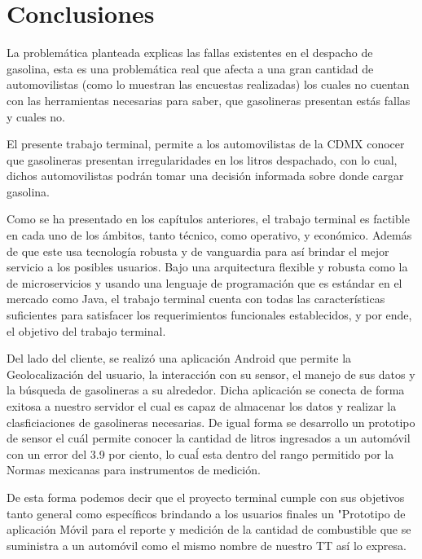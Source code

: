 \chapter{Conclusiones}\label{chapter7}
La problemática planteada explicas las fallas existentes en el despacho de gasolina, esta es una problemática real que afecta a una gran cantidad de automovilistas (como lo muestran las encuestas realizadas) los cuales no cuentan con las herramientas necesarias para saber, que gasolineras presentan estás fallas y cuales no. 

El presente trabajo terminal, permite a los automovilistas de la CDMX conocer que gasolineras presentan irregularidades en los litros despachado, con lo cual, dichos automovilistas podrán tomar una decisión informada sobre donde cargar gasolina.

Como se ha presentado en los capítulos anteriores, el trabajo terminal es factible en cada uno de los ámbitos, tanto técnico, como operativo, y económico. Además de que este usa tecnología robusta y de vanguardia para así brindar el mejor servicio a los posibles usuarios. Bajo una arquitectura flexible y robusta como la de microservicios y usando una lenguaje de programación que es estándar en el mercado como Java, el trabajo terminal cuenta con todas las características suficientes para satisfacer los requerimientos funcionales establecidos, y por ende, el objetivo del trabajo terminal.

Del lado del cliente, se realizó una aplicación Android que permite la Geolocalización del usuario, la interacción con su sensor, el manejo de sus datos y la búsqueda de gasolineras a su alrededor. Dicha aplicación se conecta de forma exitosa a nuestro servidor el cual es capaz de almacenar los datos y realizar la clasficiaciones de gasolineras necesarias. De igual forma se desarrollo un prototipo de sensor el cuál permite conocer la cantidad de litros ingresados a un automóvil con un error del 3.9 por ciento, lo cuaĺ esta dentro del rango permitido por la Normas mexicanas para instrumentos de medición.

De esta forma podemos decir que el proyecto terminal cumple con sus objetivos tanto general como específicos brindando a los usuarios finales un "Prototipo de aplicación Móvil para el reporte y medición de la cantidad de combustible que se suministra a un automóvil como el mismo nombre de nuestro TT así lo expresa.


